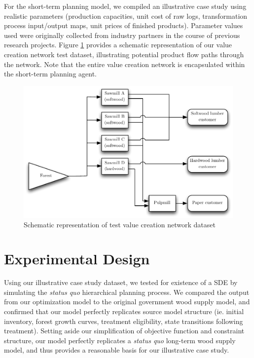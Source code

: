 For the short-term planning model, we compiled an illustrative case
study using realistic parameters (production capacities, unit cost of
raw logs, transformation process input/output maps, unit prices of
finished products). Parameter values used were originally collected
from industry partners in the course of previous research
projects. Figure \ref{fig:schematic-vcn} provides a schematic
representation of our value creation network test dataset,
illustrating potential product flow paths through the network. Note
that the entire value creation network is encapsulated within the
short-term planning agent.

\begin{figure}[ht!]
\caption{Schematic representation of test value creation network dataset}
\label{fig:schematic-vcn}
\centering{}\includegraphics[width=\columnwidth]{images/vcn-schematic}
\end{figure}



\section{Experimental Design}
\label{sec:experiment}

Using our illustrative case study dataset, we tested for existence of
a SDE by simulating the \emph{status quo} hierarchical planning
process. We compared the output from our optimization model to the
original government wood supply model, and confirmed that our model
perfectly replicates source model structure (ie. initial inventory,
forest growth curves, treatment eligibility, state transitions
following treatment). Setting aside our simplification of objective
function and constraint structure, our model perfectly replicates a
\emph{status quo} long-term wood supply model, and thus provides a
reasonable basis for our illustrative case study.

